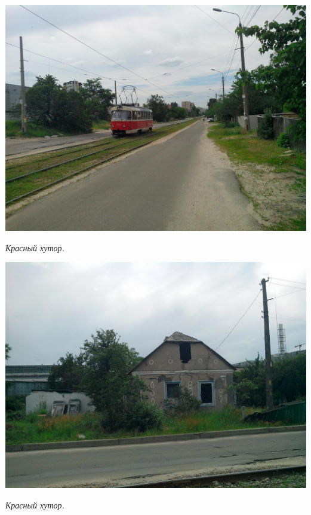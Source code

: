 \begin{center}
\includegraphics[width=\linewidth]{lpix/IMG_20160613_152358.jpg}

\textit{Красный хутор.}
\end{center}

\newpage

\begin{center}
\includegraphics[width=\linewidth]{lpix/IMG_20160613_152456.jpg}

\textit{Красный хутор.}
\end{center}


